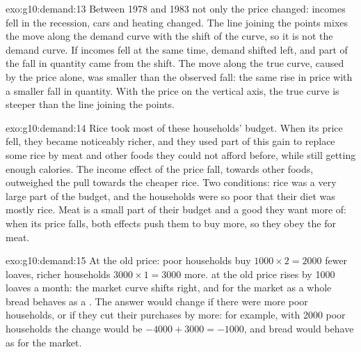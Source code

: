 \begin{solution}{exo:g10:demand:13}
Between 1978 and 1983 not only the price changed: incomes fell in the recession, cars and heating changed. The line joining the
points mixes the move along the demand curve with the shift of the curve, so it is not the demand curve. If incomes fell at the
same time, demand shifted left, and part of the fall in quantity came from the shift. The move along the true curve, caused by the
price alone, was smaller than the observed fall: the same rise in price with a smaller fall in quantity. With the price on the
vertical axis, the true curve is steeper than the line joining the points.
\end{solution}

\begin{solution}{exo:g10:demand:14}
Rice took most of these households' budget. When its price fell, they became noticeably richer, and they used part of this gain to
replace some rice by meat and other foods they could not afford before, while still getting enough calories. The income effect of
the price fall, towards other foods, outweighed the pull towards the cheaper rice. Two conditions: rice was a very large part of
the budget, and the households were so poor that their diet was mostly rice. Meat is a small part of their budget and a good they
want more of: when its price falls, both effects push them to buy more, so they obey the  for meat.
\end{solution}

\begin{solution}{exo:g10:demand:15}
At the old price: poor households buy $1000 \times 2 = 2000$ fewer loaves, richer households $3000 \times 1 = 3000$ more. 
at the old price rises by \num{1000} loaves a month: the market curve shifts right, and for the market as a whole bread behaves as a
. The answer would change if there were more poor households, or if they cut their purchases by more: for example, with
\num{2000} poor households the change would be $-4000 + 3000 = -1000$, and bread would behave as  for the market.
\end{solution}

